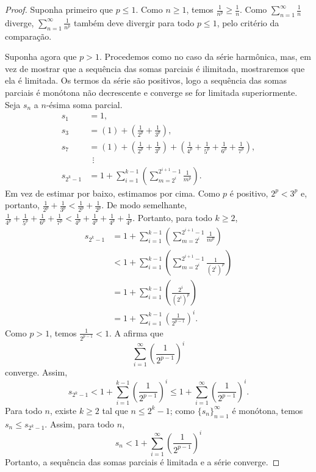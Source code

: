 \begin{proof}
Suponha primeiro que $p \leq 1$.
Como $n \geq 1$, temos
$\frac{1}{n^p} \geq \frac{1}{n}$. Como
$\sum_{n=1}^\infty \frac{1}{n}$ diverge,
$\sum_{n=1}^\infty \frac{1}{n^p}$ também deve divergir para todo $p \leq 1$, pelo critério da comparação.

Suponha agora que $p > 1$.
Procedemos como no caso da
série harmônica, mas, em vez de mostrar que a sequência
das somas parciais é ilimitada, mostraremos que ela é limitada.
Os termos da série são positivos, logo a sequência das somas parciais
é monótona não decrescente e converge se for limitada
superiormente.
Seja $s_n$ a $n$-ésima soma parcial.
\begin{align*}
 s_1 & = 1 , \\
 s_3 & = \left( 1 \right) + \left( \frac{1}{2^p} + \frac{1}{3^p} \right) , \\
 s_7 & = \left( 1 \right) + \left( \frac{1}{2^p} + \frac{1}{3^p} \right) +
        \left( \frac{1}{4^p} + \frac{1}{5^p} + \frac{1}{6^p} + \frac{1}{7^p} \right) , \\
& ~~ \vdots \\
 s_{2^k - 1} &= 
1 + 
\sum_{i=1}^{k-1}
\left(
\sum_{m=2^i}^{2^{i+1}-1} \frac{1}{m^p}
\right) .
\end{align*}
Em vez de estimar por baixo, estimamos por cima.
Como $p$ é positivo, $2^p < 3^p$ e, portanto,
$\frac{1}{2^p} + \frac{1}{3^p} <
\frac{1}{2^p} + \frac{1}{2^p}$. De modo semelhante,
$\frac{1}{4^p} + \frac{1}{5^p} +
\frac{1}{6^p} + \frac{1}{7^p} <
\frac{1}{4^p} + \frac{1}{4^p} +
\frac{1}{4^p} + \frac{1}{4^p}$. Portanto,
para todo $k \geq 2$,
\begin{equation*}
\begin{split}
s_{2^k-1}
& =
1+
\sum_{i=1}^{k-1}
\left(
\sum_{m=2^{i}}^{2^{i+1}-1} \frac{1}{m^p}
\right) 
\\
& <
1+
\sum_{i=1}^{k-1}
\left(
\sum_{m=2^{i}}^{2^{i+1}-1} \frac{1}{{(2^i)}^p}
\right) 
\\
& =
1+
\sum_{i=1}^{k-1}
\left(
\frac{2^i}{{(2^i)}^p}
\right) 
\\
& =
1+
\sum_{i=1}^{k-1}
{\left(
\frac{1}{2^{p-1}}
\right)}^i .
\end{split}
\end{equation*}
Como $p > 1$, temos $\frac{1}{2^{p-1}} < 1$.
A  afirma que
\begin{equation*}
\sum_{i=1}^\infty
{\left(
\frac{1}{2^{p-1}}
\right)}^i
\end{equation*}
converge. Assim,
\begin{equation*}
s_{2^k-1} < 
1+
\sum_{i=1}^{k-1}
{\left(
\frac{1}{2^{p-1}}
\right)}^i 
\leq 
1+
\sum_{i=1}^\infty
{\left(
\frac{1}{2^{p-1}}
\right)}^i .
\end{equation*}
Para todo $n$, existe $k \geq 2$ tal que $n \leq 2^k-1$; como
$\{ s_n \}_{n=1}^\infty$ é monótona, temos $s_n \leq s_{2^k-1}$.
Assim, para todo $n$,
\begin{equation*}
s_n < 
1+
\sum_{i=1}^\infty
{\left(
\frac{1}{2^{p-1}}
\right)}^i
\end{equation*}
Portanto, a sequência das somas parciais é limitada e a série converge.
\end{proof}

